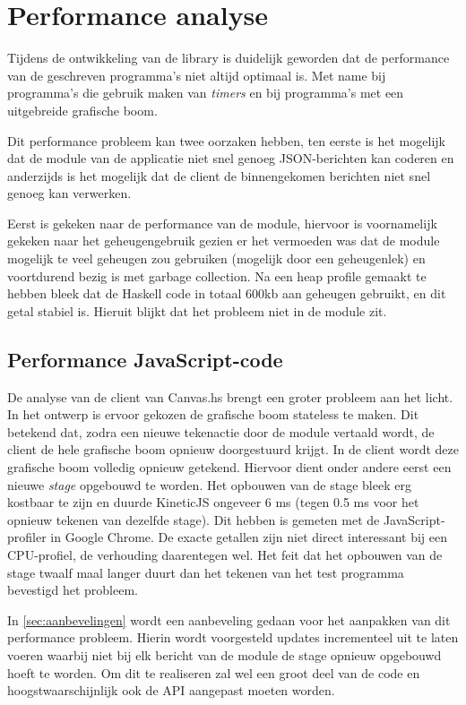 \section{Performance analyse} \label{sec:performance}

Tijdens de ontwikkeling van de library is duidelijk geworden dat de performance van de geschreven programma's niet altijd optimaal is. Met name bij programma's die gebruik maken van \emph{timers} en bij programma's met een uitgebreide grafische boom.

Dit performance probleem kan twee oorzaken hebben, ten eerste is het mogelijk dat de module van de applicatie niet snel genoeg JSON-berichten kan coderen en anderzijds is het mogelijk dat de client de binnengekomen berichten niet snel genoeg kan verwerken.

Eerst is gekeken naar de performance van de module, hiervoor is voornamelijk gekeken naar het geheugengebruik gezien er het vermoeden was dat de module mogelijk te veel geheugen zou gebruiken (mogelijk door een geheugenlek) en voortdurend bezig is met garbage collection. Na een heap profile gemaakt te hebben bleek dat de Haskell code in totaal 600kb aan geheugen gebruikt, en dit getal stabiel is. Hieruit blijkt dat het probleem niet in de module zit.

\subsection{Performance JavaScript-code}

De analyse van de client van Canvas.hs brengt een groter probleem aan het licht. In het ontwerp is ervoor gekozen de grafische boom stateless te maken. Dit betekend dat, zodra een nieuwe tekenactie door de module vertaald wordt, de client de hele grafische boom opnieuw doorgestuurd krijgt. In de client wordt deze grafische boom volledig opnieuw getekend. Hiervoor dient onder andere eerst een nieuwe \emph{stage} opgebouwd te worden.
Het opbouwen van de stage bleek erg kostbaar te zijn en duurde KineticJS ongeveer 6 ms (tegen 0.5 ms voor het opnieuw tekenen van dezelfde stage). Dit hebben is gemeten met de JavaScript-profiler in Google Chrome. De exacte getallen zijn niet direct interessant bij een CPU-profiel, de verhouding daarentegen wel. Het feit dat het opbouwen van de stage twaalf maal langer duurt dan het tekenen van het test programma bevestigd het probleem.

In \autoref{sec:aanbevelingen} wordt een aanbeveling gedaan voor het aanpakken van dit performance probleem. Hierin wordt voorgesteld updates incrementeel uit te laten voeren waarbij niet bij elk bericht van de module de stage opnieuw opgebouwd hoeft te worden. Om dit te realiseren zal wel een groot deel van de code en hoogstwaarschijnlijk ook de API aangepast moeten worden.

